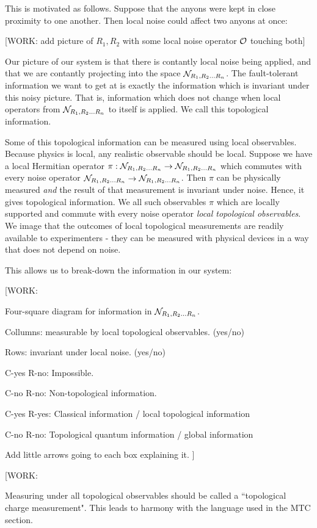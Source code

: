 This is motivated as follows. Suppose that the anyons were kept in close proximity to one another. Then local noise could affect two anyons at once:

[WORK: add picture of $R_1,R_2$ with some local noise operator $\mathcal{O}$ touching both]

Our picture of our system is that there is contantly local noise being applied, and that we are contantly projecting into the space $\mathcal{N}_{R_1,R_2... R_n}$. The fault-tolerant information we want to get at is exactly the information which is invariant under this noisy picture. That is, information which does not change when local operators from $\mathcal{N}_{R_1,R_2... R_n}$ to itself is applied. We call this topological information.

Some of this topological information can be measured using local observables. Because physics is local, any realistic observable should be local. Suppose we have a local Hermitian operator $\pi: \mathcal{N}_{R_1,R_2... R_n}\to \mathcal{N}_{R_1,R_2... R_n}$ which commutes with every noise operator $\mathcal{N}_{R_1,R_2... R_n}\to \mathcal{N}_{R_1,R_2... R_n}$. Then $\pi$ can be physically measured \textit{and} the result of that measurement is invariant under noise. Hence, it gives topological information. We all such observables $\pi$ which are locally supported and commute with every noise operator \textit{local topological observables}. We image that the outcomes of local topological measurements are readily available to experimenters - they can be measured with physical devices in a way that does not depend on noise.

This allows us to break-down the information in our system:

[WORK:

Four-square diagram for information in $\mathcal{N}_{R_1,R_2... R_n}$.

Collumns: measurable by local topological observables. (yes/no)

Rows: invariant under local noise. (yes/no)

C-yes R-no: Impossible.

C-no R-no: Non-topological information.

C-yes R-yes: Classical information / local topological information

C-no R-no: Topological quantum information / global information 

Add little arrows going to each box explaining it.
]


[WORK:

Measuring under all topological observables should be called a ``topological charge measurement". This leads to harmony with the language used in the MTC section.

